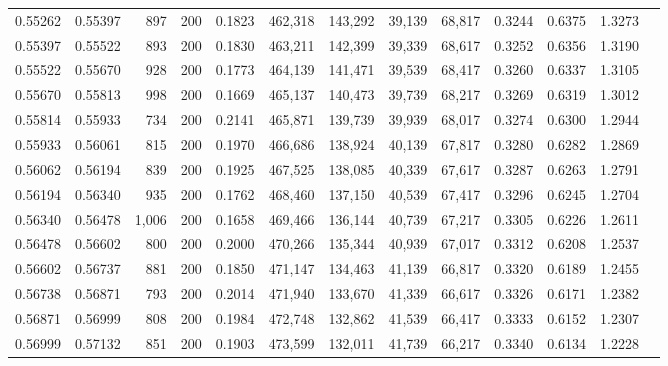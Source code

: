 \begin{tabular}{rrrrrrrrrrrrr}
0.55262 & 0.55397 &    897 & 200 &                                     0.1823 & 462,318 & 143,292 &  39,139 &  68,817 & 0.3244 & 0.6375 & 1.3273 \\
0.55397 & 0.55522 &    893 & 200 &                                     0.1830 & 463,211 & 142,399 &  39,339 &  68,617 & 0.3252 & 0.6356 & 1.3190 \\
0.55522 & 0.55670 &    928 & 200 &                                     0.1773 & 464,139 & 141,471 &  39,539 &  68,417 & 0.3260 & 0.6337 & 1.3105 \\
0.55670 & 0.55813 &    998 & 200 &                                     0.1669 & 465,137 & 140,473 &  39,739 &  68,217 & 0.3269 & 0.6319 & 1.3012 \\
0.55814 & 0.55933 &    734 & 200 &                                     0.2141 & 465,871 & 139,739 &  39,939 &  68,017 & 0.3274 & 0.6300 & 1.2944 \\
0.55933 & 0.56061 &    815 & 200 &                                     0.1970 & 466,686 & 138,924 &  40,139 &  67,817 & 0.3280 & 0.6282 & 1.2869 \\
0.56062 & 0.56194 &    839 & 200 &                                     0.1925 & 467,525 & 138,085 &  40,339 &  67,617 & 0.3287 & 0.6263 & 1.2791 \\
0.56194 & 0.56340 &    935 & 200 &                                     0.1762 & 468,460 & 137,150 &  40,539 &  67,417 & 0.3296 & 0.6245 & 1.2704 \\
0.56340 & 0.56478 &  1,006 & 200 &                                     0.1658 & 469,466 & 136,144 &  40,739 &  67,217 & 0.3305 & 0.6226 & 1.2611 \\
0.56478 & 0.56602 &    800 & 200 &                                     0.2000 & 470,266 & 135,344 &  40,939 &  67,017 & 0.3312 & 0.6208 & 1.2537 \\
0.56602 & 0.56737 &    881 & 200 &                                     0.1850 & 471,147 & 134,463 &  41,139 &  66,817 & 0.3320 & 0.6189 & 1.2455 \\
0.56738 & 0.56871 &    793 & 200 &                                     0.2014 & 471,940 & 133,670 &  41,339 &  66,617 & 0.3326 & 0.6171 & 1.2382 \\
0.56871 & 0.56999 &    808 & 200 &                                     0.1984 & 472,748 & 132,862 &  41,539 &  66,417 & 0.3333 & 0.6152 & 1.2307 \\
0.56999 & 0.57132 &    851 & 200 &                                     0.1903 & 473,599 & 132,011 &  41,739 &  66,217 & 0.3340 & 0.6134 & 1.2228 \\

\end{tabular}
